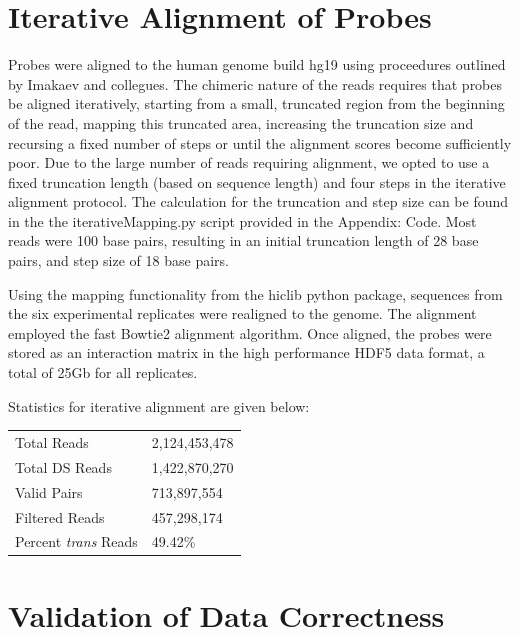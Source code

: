 \documentclass[phd,tocprelim]{cornell}
\begin{document}
\chapter{Iterative Alignment of Probes}

Probes were aligned to the human genome build hg19 using proceedures outlined by
Imakaev and collegues\cite{imakaev2012}.  The chimeric nature of the reads
requires that probes be aligned iteratively, starting from a small, truncated
region from the beginning of the read, mapping this truncated area, increasing
the truncation size and recursing a fixed number of steps or until the alignment
scores become sufficiently poor.  Due to the large number of reads requiring
alignment, we opted to use a fixed truncation length (based on sequence length)
and four steps in the iterative alignment protocol.  The calculation
for the truncation and step size can be found in the the iterativeMapping.py
script provided in the Appendix: Code.  Most reads were 100 base pairs, resulting
in an initial truncation length of 28 base pairs, and step size of 18 base pairs.

Using the mapping functionality from the hiclib python package\cite{imakaev2012},
sequences from the six experimental replicates were realigned to the genome.  The
alignment employed the fast Bowtie2 alignment algorithm\cite{langmead2012}.  Once
aligned, the probes were stored as an interaction matrix in the high performance
HDF5\cite{hdf5} data format, a total of 25Gb for all replicates.

Statistics for iterative alignment are given below:

\begin{center}
  \begin{table}
    \begin{tabular}{l l}
    Total Reads & 2,124,453,478 \\
    Total DS Reads & 1,422,870,270 \\
    Valid Pairs & 713,897,554 \\
    Filtered Reads & 457,298,174 \\
    Percent \textit{trans} Reads & 49.42\% \\
    \end{tabular}
  \end{table}
\end{center}


\chapter{Validation of Data Correctness}
\end{document}
